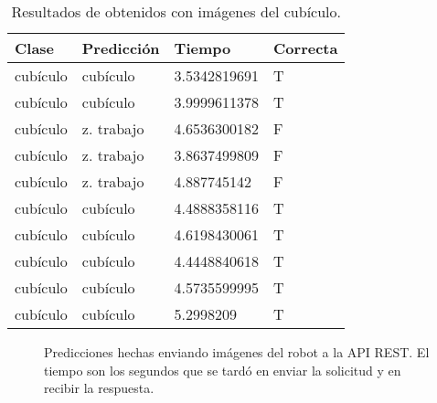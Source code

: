 \begin{table}[!h]
\centering
\begin{tabular}{|l|l|l|l|}
\hline
Clase   & Predicción & Tiempo        & Correcta \\ \hline
cubículo & cubículo    & 3.5342819691 & T        \\ \hline
cubículo & cubículo    & 3.9999611378 & T        \\ \hline
cubículo & z. trabajo & 4.6536300182 & F        \\ \hline
cubículo & z. trabajo & 3.8637499809 & F        \\ \hline
cubículo & z. trabajo & 4.887745142  & F        \\ \hline
cubículo & cubículo    & 4.4888358116 & T        \\ \hline
cubículo & cubículo    & 4.6198430061 & T        \\ \hline
cubículo & cubículo    & 4.4448840618 & T        \\ \hline
cubículo & cubículo    & 4.5735599995 & T        \\ \hline
cubículo & cubículo    & 5.2998209    & T        \\ \hline
\end{tabular}
\caption{Resultados de obtenidos con imágenes del cubículo.}
\label{table:office}
\end{table}

\begin{figure}[!ht] 
  \centering
{}
\qquad
{}
\qquad
{}
\qquad
{}
\caption{Predicciones hechas enviando imágenes del robot a la API REST. El tiempo son los
segundos que se tardó en enviar la solicitud y en recibir la respuesta. \label{nao_api_images}}
\end{figure}







 

